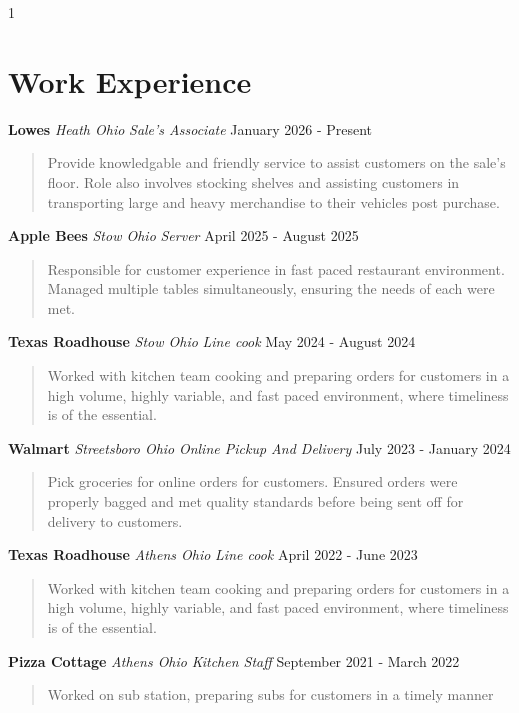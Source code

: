 \documentclass[11pt]{article}
\newcommand{\job}[5]{
    \noindent \textbf{#1} \textbar{} \textit{#5} \textbar{} \textit{#3} \hfill #2
    \par
    \begin{quote}
    #4
    \end{quote}
    \par
}
\begin{document}
\begin{spacing}{1}
        \section*{\Large \textbf{Work Experience}}
        \vspace{1em}
        \job{Lowes}
        {January 2026 - Present}
        {Sale's Associate}
        {Provide knowledgable and friendly service to assist customers on the sale's floor. Role also involves stocking shelves and assisting customers in transporting large and heavy merchandise to their vehicles post purchase.}
        {Heath Ohio}
        \job{Apple Bees}
        {April 2025 - August 2025}
        {Server}
        {Responsible for customer experience in fast paced restaurant environment. Managed multiple tables simultaneously, ensuring the needs of each were met.}
        {Stow Ohio}
        \job{Texas Roadhouse}
        {May 2024 - August 2024}
        {Line cook}
        {Worked with kitchen team cooking and preparing orders for customers in a high volume, highly variable, and fast paced environment, where timeliness is of the essential.}
        {Stow Ohio}
        \job{Walmart}
        {July 2023 - January 2024}
        {Online Pickup And Delivery}
        {Pick groceries for online orders for customers. Ensured orders were properly bagged and met quality standards before being sent off for delivery to customers.}
        {Streetsboro Ohio}
        \job{Texas Roadhouse}
        {April 2022 - June 2023}
        {Line cook}
        {Worked with kitchen team cooking and preparing orders for customers in a high volume, highly variable, and fast paced environment, where timeliness is of the essential.}
        {Athens Ohio}
        \job{Pizza Cottage}
        {September 2021 - March 2022}
        {Kitchen Staff}
        {Worked on sub station, preparing subs for customers in a timely manner}
        {Athens Ohio}
    \end{spacing}
\end{document}
